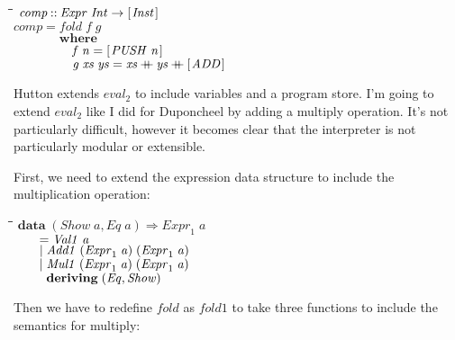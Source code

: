 \documentclass[10pt]{article}
\newlength{\lwidth}\setlength{\lwidth}{4.5cm}
\newlength{\cwidth}\setlength{\cwidth}{8mm} %
\newcommand{\Conid}[1]{\mathit{#1}}
\newcommand{\Varid}[1]{\mathit{#1}}
\newcommand{\plus}{\mathbin{+\!\!\!+}}
\begin{document}
\begin{tabbing}
\qquad\=\hspace{\lwidth}\=\hspace{\cwidth}\=\+\kill
${\Varid{comp}\mathbin{::}\Conid{Expr}\;\Conid{Int}\to [\mskip1.5mu \Conid{Inst}\mskip1.5mu]}$\\
${\Varid{comp}\mathrel{=}\Varid{fold}\;\Varid{f}\;\Varid{g}}$\\
${\phantom{\Varid{comp}\mathrel{=}\mbox{}}\mathbf{where}}$\\
${\phantom{\Varid{comp}\mathrel{=}\mbox{}}\hskip1.00em\relax\Varid{f}\;\Varid{n}\mathrel{=}[\mskip1.5mu \Conid{PUSH}\;\Varid{n}\mskip1.5mu]}$\\
${\phantom{\Varid{comp}\mathrel{=}\mbox{}}\hskip1.00em\relax\Varid{g}\;\Varid{xs}\;\Varid{ys}\mathrel{=}\Varid{xs}\plus \Varid{ys}\plus [\mskip1.5mu \Conid{ADD}\mskip1.5mu]}$
\end{tabbing}
Hutton extends \ensuremath{\Varid{eval}_2} to include variables and a program store.  I'm
going to extend \ensuremath{\Varid{eval}_2} like I did for Duponcheel by adding a multiply
operation.  It's not particularly difficult, however it becomes clear
that the interpreter is not particularly modular or extensible.

First, we need to extend the expression data structure to include the multiplication operation:

\begin{tabbing}
\qquad\=\hspace{\lwidth}\=\hspace{\cwidth}\=\+\kill
${\mathbf{data}\;(\Conid{Show}\;\Varid{a},\Conid{Eq}\;\Varid{a})\Rightarrow \Varid{Expr}_1\;\Varid{a}}$\\
${\hskip2.00em\relax\mathrel{=}\Conid{Val1}\;\Varid{a}}$\\
${\hskip2.00em\relax\mid \Conid{Add1}\;(\Varid{Expr}_1\;\Varid{a})\;(\Varid{Expr}_1\;\Varid{a})}$\\
${\hskip2.00em\relax\mid \Conid{Mul1}\;(\Varid{Expr}_1\;\Varid{a})\;(\Varid{Expr}_1\;\Varid{a})}$\\
${\hskip2.00em\relax\phantom{\mid \mbox{}}\mathbf{deriving}\;(\Conid{Eq},\Conid{Show})}$
\end{tabbing}
Then we have to redefine \ensuremath{\Varid{fold}} as \ensuremath{\Varid{fold1}} to take three functions to
include the semantics for multiply:
\end{document}
